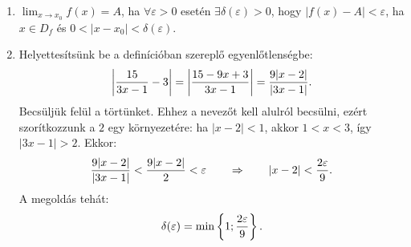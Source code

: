 \documentclass[11pt]{scrartcl}
\begin{document}
\begin{enumerate}
	\item $\displaystyle\lim_{x \to x_0} f(x) = A$, ha
	      $\forall \varepsilon > 0$ esetén $\exists \delta(\varepsilon) > 0$,
	      hogy $|f(x) - A| < \varepsilon$, ha $x \in D_f$ és
	      $0 < |x - x_0| < \delta(\varepsilon)$.

	\item Helyettesítsünk be a definícióban szereplő egyenlőtlenségbe:
	      \[
		      \left| \frac{15}{3x - 1} - 3 \right|
		      = \left| \frac{15 - 9x + 3}{3x - 1} \right|
		      = \frac{9 |x - 2|}{|3x - 1|}
		      \text.
	      \]
	      Becsüljük felül a törtünket. Ehhez a nevezőt kell alulról becsülni,
	      ezért szorítkozzunk a $2$ egy környezetére: ha $|x - 2| < 1$, akkor
	      $1 < x < 3$, így $|3x - 1| > 2$. Ekkor:
	      \[
		      \frac{9 |x - 2|}{|3x - 1|}
		      < \frac{9 |x - 2|}{2}
		      < \varepsilon
		      \qquad \Rightarrow \qquad
		      |x - 2| < \frac{2 \varepsilon}{9}
		      \text.
	      \]
	      A megoldás tehát:
	      \[
		      \delta(\varepsilon) = \min \left\{ 1; \frac{2 \varepsilon}{9} \right\}
		      \text.
	      \]
\end{enumerate}
\end{document}
